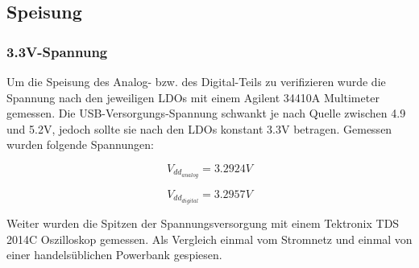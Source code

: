 \subsection{Speisung}
\label{subsec:Speisung}

\subsubsection{3.3V-Spannung}
Um die Speisung des Analog- bzw. des Digital-Teils zu verifizieren wurde die Spannung nach den jeweiligen LDOs mit einem Agilent 34410A Multimeter gemessen. Die USB-Versorgungs-Spannung schwankt je nach Quelle zwischen 4.9 und 5.2V, jedoch sollte sie nach den LDOs konstant 3.3V betragen. Gemessen wurden folgende Spannungen:

\begin{equation}
V_{dd_{analog}}=3.2924\si{V}
\end{equation}

\begin{equation}
V_{dd_{digital}}=3.2957\si{V}
\end{equation}

Weiter wurden die Spitzen der Spannungsversorgung mit einem Tektronix TDS 2014C Oszilloskop gemessen. Als Vergleich einmal vom Stromnetz und einmal von einer handelsüblichen Powerbank gespiesen.

